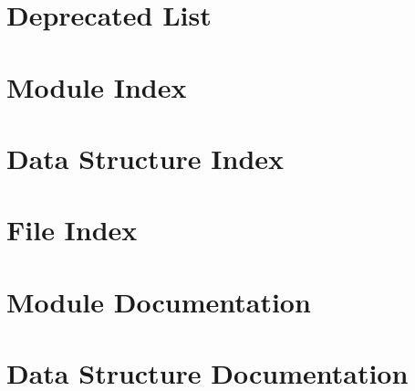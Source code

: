 \documentclass{book}
\begin{document}
\chapter{Deprecated List}
\label{deprecated}
\hypertarget{deprecated}{}

\chapter{Module Index}

\chapter{Data Structure Index}

\chapter{File Index}

\chapter{Module Documentation}







































\chapter{Data Structure Documentation}














\end{document}
